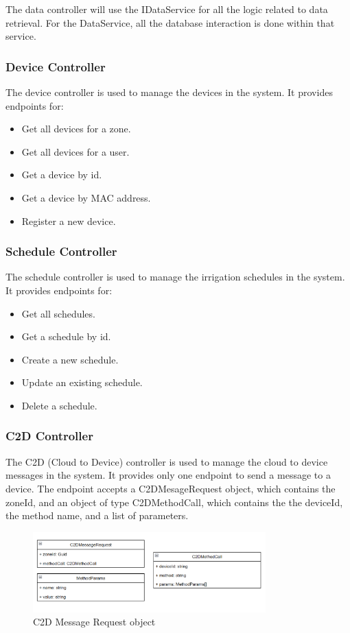 The data controller will use the IDataService for all the logic related to data retrieval.
For the DataService, all the database interaction is done within that service.

\subsubsection{Device Controller}
The device controller is used to manage the devices in the system.
It provides endpoints for:
\begin{itemize}
    \item Get all devices for a zone.
    \item Get all devices for a user.
    \item Get a device by id.
    \item Get a device by MAC address.
    \item Register a new device.
\end{itemize}

\subsubsection{Schedule Controller}
The schedule controller is used to manage the irrigation schedules in the system.
It provides endpoints for:
\begin{itemize}
    \item Get all schedules.
    \item Get a schedule by id.
    \item Create a new schedule.
    \item Update an existing schedule.
    \item Delete a schedule.
\end{itemize}

\subsubsection{C2D Controller}
The C2D (Cloud to Device) controller is used to manage the cloud to device messages in the system.
It provides only one endpoint to send a message to a device. The endpoint accepts a C2DMesageRequest object, 
which contains the zoneId, and an object of type C2DMethodCall, which contains the the deviceId, the method name, and a list of parameters.
\begin{figure}[H]
    \centering
    \includegraphics[width=0.8\textwidth]{images/c2d-message-request.png}
    \caption{C2D Message Request object}
    \label{fig:c2d-request}
\end{figure}


